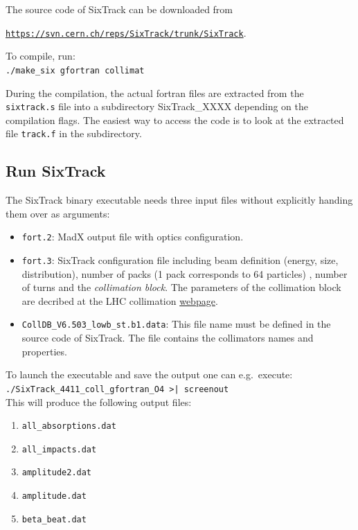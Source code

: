 \documentclass[a4paper, oneside, final]{scrartcl}
\begin{document}
The source code of SixTrack can be downloaded from\\ {\href{https://svn.cern.ch/reps/SixTrack/trunk/SixTrack}{\texttt{https://svn.cern.ch/reps/SixTrack/trunk/SixTrack}}. \newline

To compile, run:\\
\texttt{./make\_six gfortran collimat}\newline

During the compilation, the actual fortran files are extracted from the \texttt{sixtrack.s} file into a subdirectory SixTrack\_XXXX depending on the compilation flags. The easiest way to access the code is to look at the extracted file \texttt{track.f} in the subdirectory. 

\subsection{Run SixTrack}
The SixTrack binary executable needs three input files without explicitly handing them over as arguments:

\begin{itemize}
\item \texttt{fort.2}: MadX output file with optics configuration.
\item \texttt{fort.3}: SixTrack configuration file including beam definition (energy, size, distribution), number of packs (1 pack corresponds to 64 particles) , number of turns and the \textit{collimation block}. The parameters of the collimation block are decribed at the LHC collimation {\href{http://lhc-collimation-project.web.cern.ch/lhc-collimation-project/code-tracking-2012.php}{webpage}}.
\item \texttt{CollDB\_V6.503\_lowb\_st.b1.data}: This file name must be defined in the source code of SixTrack. The file contains the collimators names and properties.
\end{itemize}

To launch the executable and save the output one can e.g.~execute: \\
\texttt{./SixTrack\_4411\_coll\_gfortran\_O4 >| screenout} \\

This will produce the following output files:

\begin{enumerate}
\item \texttt{all\_absorptions.dat}
\item \texttt{all\_impacts.dat}
\item \texttt{amplitude2.dat}
\item \texttt{amplitude.dat}
\item \texttt{beta\_beat.dat}


\end{enumerate}}
\end{document}
